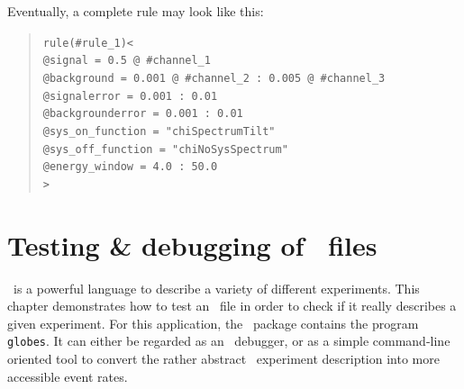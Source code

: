Eventually, a complete rule may look like this:
\begin{quote}
{\tt rule(\#rule\_1)<\\
\tb @signal = 0.5 @ \#channel\_1\\
\tb @background = 0.001 @ \#channel\_2 :\ 0.005 @ \#channel\_3\\
\tb @signalerror =       0.001  :\ 0.01\\
\tb @backgrounderror =   0.001 :\ 0.01\\
\tb @sys\_on\_function = "chiSpectrumTilt"  \\
\tb @sys\_off\_function = "chiNoSysSpectrum"  \\
\tb @energy\_window = 4.0 :\ 50.0 \\
>}
\end{quote}

%
% 

\chapter{Testing \& debugging of \AEDL\ files}
\label{chap:exp_def}

\AEDL\ is a powerful language to describe a variety 
of different experiments.
This chapter demonstrates how to test an \AEDL\ file in order to check
if it really describes a given experiment. 
For this application, the \GLOBES\ package contains the program
{\tt globes}. It can either be 
regarded as an \AEDL\ debugger, or as a simple command-line oriented tool to convert the rather  abstract \AEDL\ experiment description into more accessible event rates.

